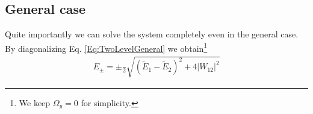 \subsection{General case}

Quite importantly we can solve the system completely even in the general case. By diagonalizing  Eq. \eqref{Eq:TwoLevelGeneral} we obtain\footnote{We keep $\Omega_y =0$ for simplicity.}
\begin{align}\label{eq:Epm}
 E_\pm = \pm \frac{}{2} \sqrt{\left(\tilde{E}_1-\tilde{E}_2\right)^2+4 \left|W_{12}\right|^2}
\end{align}